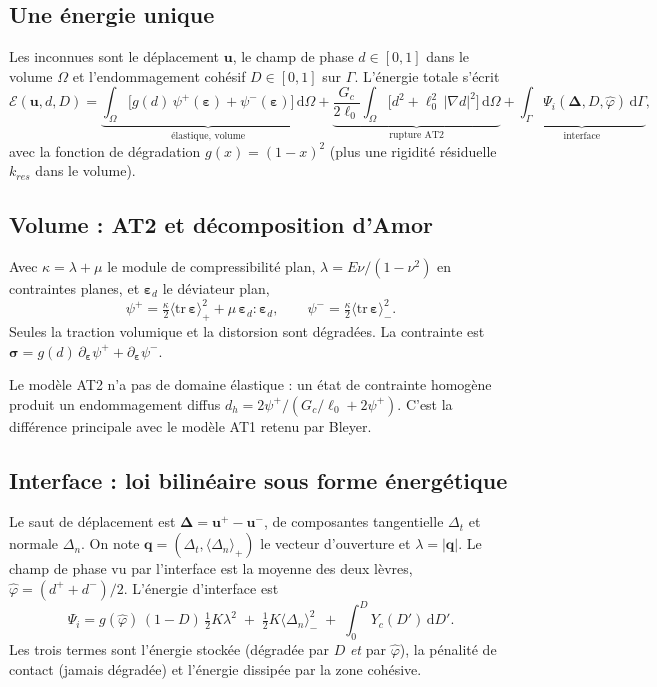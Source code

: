 \documentclass[11pt,a4paper]{article}
\newcommand{\bu}{\bm{u}}\newcommand{\bq}{\bm{q}}\newcommand{\bt}{\bm{t}}
\newcommand{\beps}{\bm{\varepsilon}}\newcommand{\bsig}{\bm{\sigma}}
\newcommand{\jump}{\bm{\Delta}}\newcommand{\Do}{\Delta_o}\newcommand{\Dc}{\Delta_c}
\newcommand{\phib}{\hat\varphi}
\newcommand{\pos}[1]{\langle #1\rangle_+}\newcommand{\nega}[1]{\langle #1\rangle_-}
\newcommand{\dd}{\,\mathrm{d}}
\begin{document}
\subsection{Une énergie unique}
Les inconnues sont le déplacement $\bu$, le champ de phase $d\in[0,1]$ dans le volume $\Omega$ et
l'endommagement cohésif $D\in[0,1]$ sur $\Gamma$. L'énergie totale s'écrit
\begin{equation}
\mathcal{E}(\bu,d,D) = \underbrace{\int_\Omega \big[g(d)\,\psi^+(\beps)+\psi^-(\beps)\big]\dd\Omega}_{\text{élastique, volume}}
+\underbrace{\frac{G_c}{2\ell_0}\int_\Omega\big[d^2+\ell_0^2\,|\nabla d|^2\big]\dd\Omega}_{\text{rupture AT2}}
+\underbrace{\int_\Gamma \Psi_i(\jump,D,\phib)\dd\Gamma}_{\text{interface}},
\label{eq:energie}
\end{equation}
avec la fonction de dégradation $g(x)=(1-x)^2$ (plus une rigidité résiduelle $k_{res}$ dans le volume).

\subsection{Volume : AT2 et décomposition d'Amor}
Avec $\kappa=\lambda+\mu$ le module de compressibilité plan, $\lambda = E\nu/(1-\nu^2)$ en contraintes
planes, et $\beps_d$ le déviateur plan,
\begin{equation}
\psi^+ = \tfrac{\kappa}{2}\pos{\mathrm{tr}\,\beps}^2+\mu\,\beps_d:\beps_d,\qquad
\psi^- = \tfrac{\kappa}{2}\nega{\mathrm{tr}\,\beps}^2 .
\end{equation}
Seules la traction volumique et la distorsion sont dégradées. La contrainte est
$\bsig = g(d)\,\partial_{\beps}\psi^+ + \partial_{\beps}\psi^-$.

Le modèle AT2 n'a pas de domaine élastique : un état de contrainte homogène produit un endommagement
diffus $d_h = 2\psi^+/(G_c/\ell_0+2\psi^+)$. C'est la différence principale avec le modèle AT1 retenu
par Bleyer.

\subsection{Interface : loi bilinéaire sous forme énergétique}
Le saut de déplacement est $\jump=\bu^+-\bu^-$, de composantes tangentielle $\Delta_t$ et normale
$\Delta_n$. On note $\bq=(\Delta_t,\pos{\Delta_n})$ le vecteur d'ouverture et $\lambda=|\bq|$. Le champ
de phase vu par l'interface est la moyenne des deux lèvres, $\phib=(d^++d^-)/2$. L'énergie d'interface est
\begin{equation}
\Psi_i = g(\phib)\,(1-D)\,\tfrac12 K\lambda^2 \;+\; \tfrac12 K\nega{\Delta_n}^2 \;+\; \int_0^D Y_c(D')\dd D' .
\label{eq:psi_i}
\end{equation}
Les trois termes sont l'énergie stockée (dégradée par $D$ \emph{et} par $\phib$), la pénalité de contact
(jamais dégradée) et l'énergie dissipée par la zone cohésive.
\end{document}
